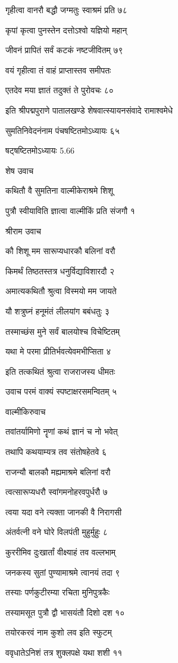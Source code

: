 गृहीत्वा वानरौ बद्धौ जग्मतुः स्वाश्रमं प्रति ७८

कृपां कृत्वा पुनस्तेन दत्तोऽश्वो यज्ञियो महान्

जीवनं प्रापितं सर्वं कटकं नष्टजीवितम् ७९

वयं गृहीत्वा तं वाहं प्राप्तास्तव समीपतः

एतदेव मया ज्ञातं तदुक्तं ते पुरोवचः ८०

इति श्रीपद्मपुराणे पातालखण्डे शेषवात्स्यायनसंवादे रामाश्वमेधे

सुमतिनिवेदनंनाम पंचषष्टितमोऽध्यायः ६५

षट्षष्टितमोऽध्यायः 5.66

शेष उवाच

कथितौ वै सुमतिना वाल्मीकेराश्रमे शिशू

पुत्रौ स्वीयाविति ज्ञात्वा वाल्मीकिं प्रति संजगौ १

श्रीराम उवाच

कौ शिशू मम सारूप्यधारकौ बलिनां वरौ

किमर्थं तिष्ठतस्तत्र धनुर्विद्याविशारदौ २

अमात्यकथितौ श्रुत्वा विस्मयो मम जायते

यौ शत्रुघ्नं हनूमंतं लीलयांग बबंधतुः ३

तस्माच्छंस मुने सर्वं बालयोश्च विचेष्टितम्

यथा मे परमा प्रीतिर्भवत्येवमभीप्सिता ४

इति तत्कथितं श्रुत्वा राजराजस्य धीमतः

उवाच परमं वाक्यं स्पष्टाक्षरसमन्वितम् ५

वाल्मीकिरुवाच

तवांतर्यामिणो नॄणां कथं ज्ञानं च नो भवेत्

तथापि कथयाम्यत्र तव संतोषहेतवे ६

राजन्यौ बालकौ मह्यमाश्रमे बलिनां वरौ

त्वत्सारूप्यधरौ स्वांगमनोहरवपुर्धरौ ७

त्वया यदा वने त्यक्ता जानकी वै निरागसी

अंतर्वत्नी वने घोरे विलपंती मुहुर्मुहुः ८

कुररीमिव दुःखार्तां वीक्ष्याहं तव वल्लभाम्

जनकस्य सुतां पुण्यामाश्रमे त्वानयं तदा ९

तस्याः पर्णकुटीरम्या रचिता मुनिपुत्रकैः

तस्यामसूत पुत्रौ द्वौ भासयंतौ दिशो दश १०

तयोरकरवं नाम कुशो लव इति स्फुटम्

ववृधातेऽनिशं तत्र शुक्लपक्षे यथा शशी ११

